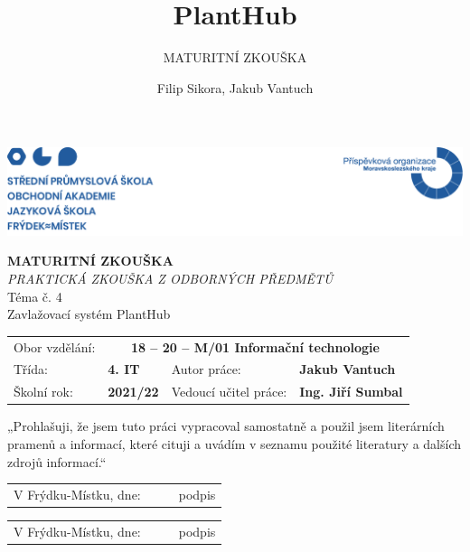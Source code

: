 \documentclass[12pt,a4paper]{article}
\title{PlantHub}
\subtitle{MATURITNÍ ZKOUŠKA }
\author{Filip Sikora, Jakub Vantuch}
\date{}
\begin{document}
\renewcommand\refname{}

\begin{titlepage}
	\noindent\includegraphics[width=\linewidth]{header.png}
	\begin{center}
		\vspace*{0.2cm}
		\Huge\textbf{MATURITNÍ ZKOUŠKA}
		\vspace*{1cm} \\
		\large \emph{PRAKTICKÁ ZKOUŠKA Z ODBORNÝCH PŘEDMĚTŮ}
		\vspace*{1cm} \\
		\Large Téma č. 4 \\
		\vspace*{1cm}
		\Large Zavlažovací systém PlantHub \\
		\vspace*{1.3cm}
		\normalsize
	\end{center}
	\begin{tabularx}{\textwidth}{l@{\hskip 0.5cm}XXl}
		Obor vzdělání:        & \multicolumn{3}{c}{\textbf{18 – 20 –
				M/01
				Informační technologie}}
		\\[10pt]
		Třída:                & \textbf{4. IT}
		                      &
		Autor práce:          & \textbf{Jakub Vantuch}
		\\[10pt]
		Školní rok:           & \textbf{2021/22}
		                      &
		Vedoucí učitel práce: &
		\textbf{Ing. Jiří Sumbal}
		\vspace*{2cm}
	\end{tabularx}
	„Prohlašuji, že jsem tuto práci vypracoval samostatně a použil jsem
	literárních
	pramenů a informací, které cituji a uvádím v seznamu použité literatury
	a
	dalších zdrojů informací.“

	\noindent\begin{tabularx}{\textwidth}{l@{\hskip 0.5cm}XXl}
		\\[10pt]
		V Frýdku-Místku, dne: & \textbf{\dotfill}
		                      &
		\textbf{\dotfill}     & podpis
	\end{tabularx}
	
	\noindent\begin{tabularx}{\textwidth}{l@{\hskip 0.5cm}XXl}
		\\[10pt]
		V Frýdku-Místku, dne: & \textbf{\dotfill}
		                      &
		\textbf{\dotfill}     & podpis
	\end{tabularx}
\end{titlepage}
\end{document}
